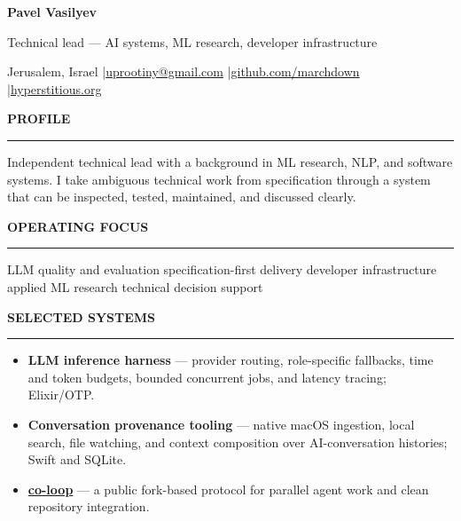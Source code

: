 \documentclass[10.5pt,a4paper]{article}
\newcommand{\cvsection}[1]{%
  \vspace{7pt}%
  {\small\bfseries\MakeUppercase{#1}}\par
  \vspace{2.5pt}\hrule\vspace{3.5pt}%
}
\begin{document}
\color{ink}

{\LARGE\bfseries Pavel Vasilyev}\par
\vspace{1.5pt}
{\large Technical lead --- AI systems, ML research, developer infrastructure}\par
\vspace{3pt}
{\small Jerusalem, Israel \enspace|\enspace \href{mailto:uprootiny@gmail.com}{uprootiny@gmail.com} \enspace|\enspace \href{https://github.com/marchdown}{github.com/marchdown} \enspace|\enspace \href{https://hyperstitious.org}{hyperstitious.org}}\par

\cvsection{Profile}
Independent technical lead with a background in ML research, NLP, and software systems. I take ambiguous technical work from specification through a system that can be inspected, tested, maintained, and discussed clearly.

\cvsection{Operating focus}
LLM quality and evaluation \enspace\textbullet\enspace specification-first delivery \enspace\textbullet\enspace developer infrastructure \enspace\textbullet\enspace applied ML research \enspace\textbullet\enspace technical decision support

\cvsection{Selected systems}
\begin{itemize}
  \item \textbf{LLM inference harness} --- provider routing, role-specific fallbacks, time and token budgets, bounded concurrent jobs, and latency tracing; Elixir/OTP.
  \item \textbf{Conversation provenance tooling} --- native macOS ingestion, local search, file watching, and context composition over AI-conversation histories; Swift and SQLite.
  \item \textbf{\href{https://github.com/marchdown/co-loop}{co-loop}} --- a public fork-based protocol for parallel agent work and clean repository integration.
\end{itemize}
\end{document}
